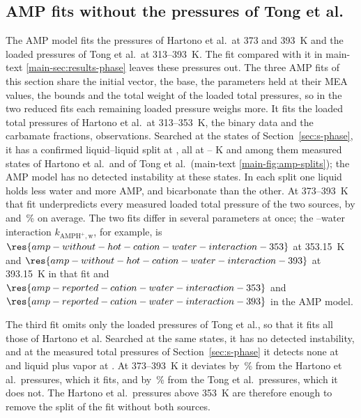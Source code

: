 \documentclass[a4paper,11pt]{article}
\begin{document}
\subsection{AMP fits without the pressures of Tong et al.}\label{sec:s-amp-slope}
The AMP model fits the  pressures of Hartono et al.\ at 373 and \SI{393}{\kelvin} and the  loaded pressures of Tong et al.\ at 313--\SI{393}{\kelvin}.
The fit compared with it in main-text \cref{main-sec:results-phase} leaves these pressures out.
The three AMP fits of this section share the initial vector, the base, the parameters held at their MEA values, the bounds and the total weight of the loaded total pressures, so in the two reduced fits each remaining loaded pressure weighs more.
It fits the  loaded total pressures of Hartono et al.\ at 313--\SI{353}{\kelvin}, the binary data and the carbamate fractions,  observations.
Searched at the  states of Section~\ref{sec:s-phase}, it has a confirmed liquid--liquid split at , all at -- K and among them  measured states of Hartono et al.\ and of Tong et al.\ (main-text \cref{main-fig:amp-splits}); the AMP model has no detected instability at these states.
In each split one liquid holds less water and more AMP,  and bicarbonate than the other.
At 373--\SI{393}{\kelvin} that fit underpredicts every measured loaded total pressure of the two sources, by  and \,\% on average.
The two fits differ in several parameters at once; the --water interaction $k_{\mathrm{AMPH^+,w}}$, for example, is $\res{amp-without-hot-cation-water-interaction-353}$ at \SI{353.15}{\kelvin} and $\res{amp-without-hot-cation-water-interaction-393}$ at \SI{393.15}{\kelvin} in that fit and $\res{amp-reported-cation-water-interaction-353}$ and $\res{amp-reported-cation-water-interaction-393}$ in the AMP model.

The third fit omits only the loaded pressures of Tong et al., so that it fits all those of Hartono et al.
Searched at the same states, it has no detected instability, and at the measured total pressures of Section~\ref{sec:s-phase} it detects none at  and liquid plus vapor at .
At 373--\SI{393}{\kelvin} it deviates by \,\% from the Hartono et al.\ pressures, which it fits, and by \,\% from the Tong et al.\ pressures, which it does not.
The Hartono et al.\ pressures above \SI{353}{\kelvin} are therefore enough to remove the split of the fit without both sources.
\end{document}
